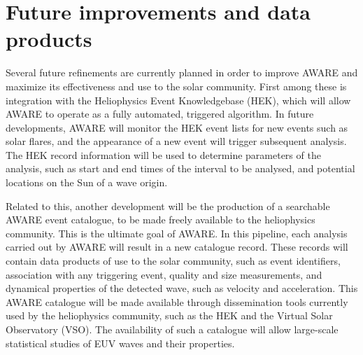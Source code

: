 \section{Future improvements and data products}\label{sec:future}

Several future refinements are currently planned in order to improve AWARE and maximize its effectiveness and use to the solar community. First among these is integration with the Heliophysics Event Knowledgebase (HEK), which will allow AWARE to operate as a fully automated, triggered algorithm. In future developments, AWARE will monitor the HEK event lists for new events such as solar flares, and the appearance of a new event will trigger subsequent analysis. The HEK record information will be used to determine parameters of the analysis, such as start and end times of the interval to be analysed, and potential locations on the Sun of a wave origin.

Related to this, another development will be the production of a searchable AWARE event catalogue, to be made freely available to the heliophysics community. This is the ultimate goal of AWARE. In this pipeline, each analysis carried out by AWARE will result in a new catalogue record. These records will contain data products of use to the solar community, such as event identifiers, association with any triggering event, quality and size measurements, and dynamical properties of the detected wave, such as velocity and acceleration. This AWARE catalogue will be made available through dissemination tools currently used by the heliophysics community, such as the HEK and the Virtual Solar Observatory (VSO). The availability of such a catalogue will allow large-scale statistical studies of EUV waves and their properties.
